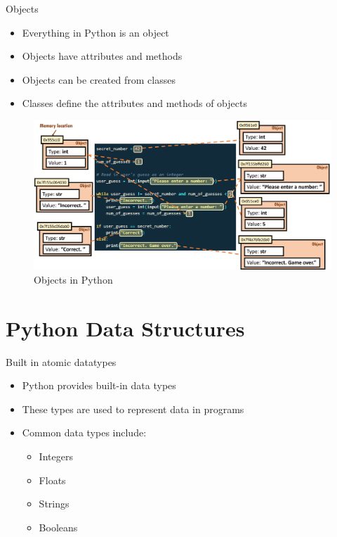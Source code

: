 \documentclass{beamer}
\begin{document}
    




\begin{frame}{Objects}
    \begin{itemize}
        \item Everything in Python is an object
        \item Objects have attributes and methods
        \item Objects can be created from classes
        \item Classes define the attributes and methods of objects
    \end{itemize}
\end{frame}
\begin{frame}
    \begin{figure}
        \centering
        \includegraphics[width=1.0\textwidth]{pics/objects.png}
        \caption{Objects in Python}
    \end{figure}
\end{frame}

\section{Python Data Structures}
\begin{frame}{Built in atomic datatypes}
    \begin{itemize}
        \item Python provides built-in data types
        \item These types are used to represent data in programs
        \item Common data types include:
        \begin{itemize}
            \item Integers
            \item Floats
            \item Strings
            \item Booleans
        \end{itemize}
    \end{itemize}

\end{frame}
\end{document}
